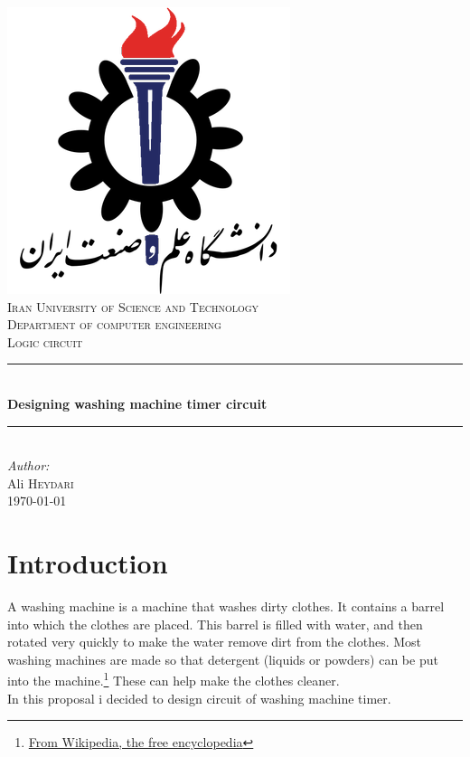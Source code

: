 \documentclass[12pt]{article}
\begin{document}
\begin{titlepage}

\newcommand{\HRule}{\rule{\linewidth}{0.5mm}}

\center

\includegraphics[scale=0.3]{IUST_logo_color}\\[1cm]
\textsc{\Large Iran University of Science and Technology}\\[1.5cm]
\textsc{\large Department of computer engineering}\\[0.5cm]
\textsc{Logic circuit}\\[0.5cm]



\HRule \\[0.4cm]
{ \huge \bfseries Designing washing machine timer circuit}\\[0.4cm]
\HRule \\[1.5cm]

\Large \emph{Author:}\\
Ali \textsc{Heydari}\\[3cm]

{\large \today}\\[2cm]

\vfill

\end{titlepage}



\section{Introduction}

A washing machine is a machine that washes dirty clothes. It contains a barrel into which the clothes are placed. This barrel is filled with water, and then rotated very quickly to make the water remove dirt from the clothes. Most washing machines are made so that detergent (liquids or powders) can be put into the machine.\footnote{\href{https://simple.wikipedia.org/wiki/Washing_machine}{From Wikipedia, the free encyclopedia}} These can help make the clothes cleaner.
\\ In this proposal i decided to design circuit of washing machine timer.
\end{document}
